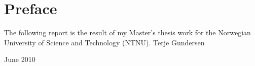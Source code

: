 \chapter*{Preface} %
\label{cha:preface}
The following report is the result of my Master's thesis work for the Norwegian University of Science and Technology (NTNU). 
\newline \newline \newline
\noindent
Terje Gundersen

\noindent
June 2010
